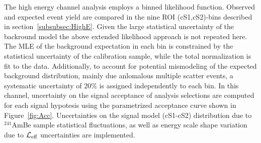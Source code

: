 The high energy channel analysis employs a binned likelihood function. Observed and expected event yield are compared in the nine ROI (cS1,cS2)-bins described in section~\ref{subsubsec:HighE}. 
Given the large statistical uncertainty of the backround model the above extended likelihood approach is not repeated here.
The MLE of the background expectation in each bin is constrained by the statistical uncertainty of the calibration sample, while the total 
normalization is fit to the data. Additionally, to account for potential mismodeling of the expected background distribution, mainly due anlomalous multiple scatter events,
a systematic uncertainty of 20\% is assigned independently to each bin. In this channel, uncertainty on the signal acceptance of analysis selections are computed for each signal hypotesis
using the parametrized acceptance curve shown in Figure~\ref{fig:Acc}.
Uncertainties on the signal model (cS1-cS2) distribution due to $^{241}$AmBe sample statistical fluctuations, as well as energy scale shape variation due to $\mathcal{L}_{\mathrm{eff}}$ uncertainties are implemented.





